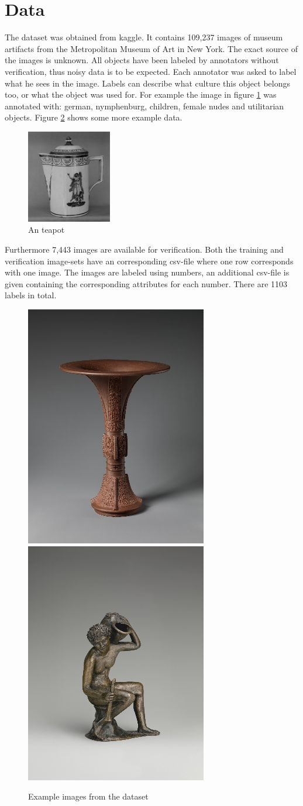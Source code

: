 
\section{Data}
The dataset was obtained from kaggle\cite{imet}.
It contains 109,237 images of museum artifacts from the Metropolitan Museum of Art in New York.
The exact source of the images is unknown.
All objects have been labeled by  annotators without verification, thus noisy data is to be expected.
Each annotator was asked to label what he sees in the image.
Labels can describe what culture this object belongs too, or what the object was used for.
For example the image in figure \ref{fig:1} was annotated with: german, nymphenburg, children, female nudes and utilitarian objects.
Figure \ref{fig:2} shows some more example data.
\begin{figure}[h]
    \includegraphics[width=0.33\textwidth]{images/1}
    \caption{An teapot}
    \label{fig:1}
\end{figure}
Furthermore 7,443 images are available for verification.
Both the training and verification image-sets have an corresponding csv-file where one row corresponds with one image.
The images are labeled using numbers, an additional csv-file is given containing the corresponding attributes for each number.
There are 1103 labels in total.
\begin{figure}[h]
    \includegraphics[width=.2\textwidth]{images/3}
    \includegraphics[width=.2\textwidth]{images/4}
    \caption{Example images from the dataset}
    \label{fig:2}
\end{figure}
